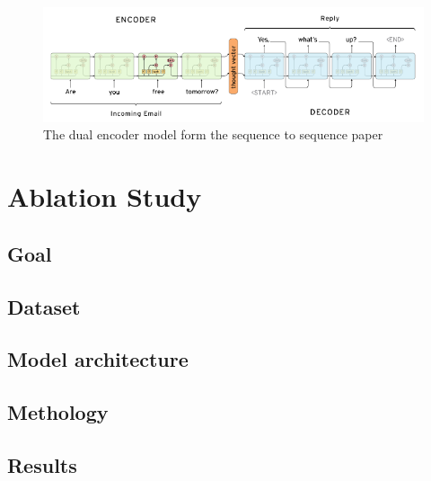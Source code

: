 \documentclass[conference]{IEEEtran}
\begin{document}
\begin{figure}[H]
\centering
   \includegraphics[width=\linewidth]{sequence_to_sequence.png}
  \caption{The dual encoder model form the sequence to sequence paper\cite{sutskever2014sequence}}
  \label{fig:dstChallengeProbabilistic}
\end{figure}

\section{Ablation Study}
\subsection{Goal}
\subsection{Dataset}
\subsection{Model architecture}
\subsection{Methology}
\subsection{Results}





%
%
\end{document}
